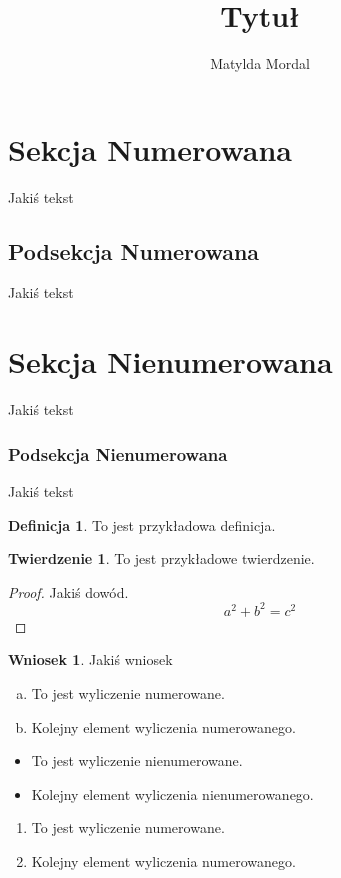 \documentclass{article}
\author{Matylda Mordal}
\title{\textbf{Tytuł}}
\date{}
\theoremstyle{definition}
\newtheorem{definition}{Definicja}
\newtheorem{theorem}{Twierdzenie}
\newtheorem{corollary}{Wniosek}
\begin{document}
	\maketitle
	\section{Sekcja Numerowana}
	Jakiś tekst
	\subsection{Podsekcja Numerowana}
	Jakiś tekst
	
	\section*{Sekcja Nienumerowana}
	Jakiś tekst
	\subsubsection*{Podsekcja Nienumerowana}
	Jakiś tekst
	
	\begin{definition}
	To jest przykładowa definicja.
	\end{definition}
	
	\begin{theorem}
	To jest przykładowe twierdzenie.
	\end{theorem}
	
	\begin{proof}
	Jakiś dowód.
	\[
	a^2 + b^2 = c^2
	\]
	\end{proof}
	
	\begin{corollary}
	Jakiś wniosek
	\end{corollary}
	
	\begin{enumerate}[a)]
		\item To jest wyliczenie numerowane.
		\item Kolejny element wyliczenia numerowanego.
	\end{enumerate}
	
	\begin{itemize}
		\item To jest wyliczenie nienumerowane.
		\item Kolejny element wyliczenia nienumerowanego.
	\end{itemize}
	
	\begin{enumerate}
		\item To jest wyliczenie numerowane.
		\item Kolejny element wyliczenia numerowanego.
	\end{enumerate}
	
\end{document}

